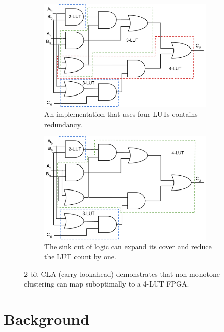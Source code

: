 \begin{figure}[tb]
    \begin{subfigure}{0.49\textwidth}
        \centering
        \includegraphics[width=0.92\textwidth]{img/cla_bad.pdf}
        \caption{An implementation that uses four LUTs contains redundancy.}\label{fig:eg:bad}
    \end{subfigure}
    \hfill
    \begin{subfigure}{0.49\textwidth}
        \centering
        \includegraphics[width=0.92\textwidth]{img/cla_good.pdf}
        \caption{The sink cut of logic can expand its cover and reduce the LUT count by one.}\label{fig:eg:good}
    \end{subfigure}
    \caption{2-bit CLA (carry-lookahead) demonstrates that non-monotone clustering can map suboptimally to a 4-LUT FPGA.}\label{fig:eg}
\end{figure}

\section{Background}\label{sec:background}

